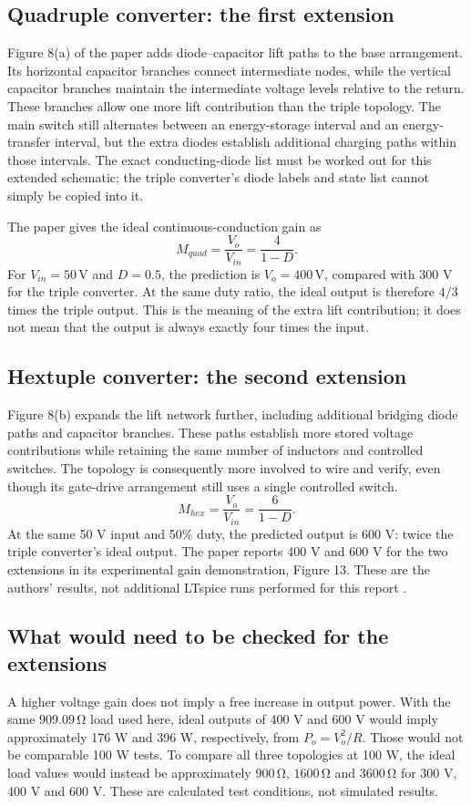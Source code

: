 \documentclass[11pt,a4paper]{article}
\newcommand{\unit}[1]{\,\mathrm{#1}}
\begin{document}
\subsection{Quadruple converter: the first extension}
Figure 8(a) of the paper adds diode--capacitor lift paths to the base arrangement. Its horizontal capacitor branches connect intermediate nodes, while the vertical capacitor branches maintain the intermediate voltage levels relative to the return. These branches allow one more lift contribution than the triple topology. The main switch still alternates between an energy-storage interval and an energy-transfer interval, but the extra diodes establish additional charging paths within those intervals. The exact conducting-diode list must be worked out for this extended schematic; the triple converter's diode labels and state list cannot simply be copied into it.

The paper gives the ideal continuous-conduction gain as
\begin{equation}
M_{quad}=\frac{V_o}{V_{in}}=\frac{4}{1-D}.
\end{equation}
For $V_{in}=50\unit{V}$ and $D=0.5$, the prediction is $V_o=400\unit{V}$, compared with 300 V for the triple converter. At the same duty ratio, the ideal output is therefore $4/3$ times the triple output. This is the meaning of the extra lift contribution; it does not mean that the output is always exactly four times the input.

\subsection{Hextuple converter: the second extension}
Figure 8(b) expands the lift network further, including additional bridging diode paths and capacitor branches. These paths establish more stored voltage contributions while retaining the same number of inductors and controlled switches. The topology is consequently more involved to wire and verify, even though its gate-drive arrangement still uses a single controlled switch.
\begin{equation}
M_{hex}=\frac{V_o}{V_{in}}=\frac{6}{1-D}.
\end{equation}
At the same 50 V input and 50\% duty, the predicted output is 600 V: twice the triple converter's ideal output. The paper reports 400 V and 600 V for the two extensions in its experimental gain demonstration, Figure 13. These are the authors' results, not additional LTspice runs performed for this report \cite{paper}.
\subsection{What would need to be checked for the extensions}
A higher voltage gain does not imply a free increase in output power. With the same $909.09\unit{\Omega}$ load used here, ideal outputs of 400 V and 600 V would imply approximately 176 W and 396 W, respectively, from $P_o=V_o^2/R$. Those would not be comparable 100 W tests. To compare all three topologies at 100 W, the ideal load values would instead be approximately $900\unit{\Omega}$, $1600\unit{\Omega}$ and $3600\unit{\Omega}$ for 300 V, 400 V and 600 V. These are calculated test conditions, not simulated results.
\end{document}
